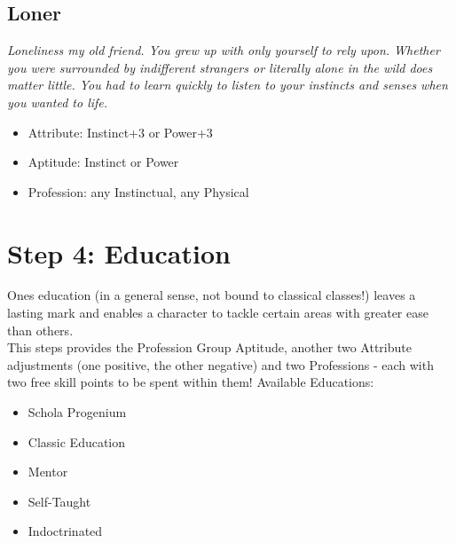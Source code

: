 	\subsection{Loner}
	\textit{Loneliness my old friend. You grew up with only yourself to rely upon. Whether you were surrounded by indifferent strangers or literally alone in the wild does matter little. You had to learn quickly to listen to your instincts and senses when you wanted to life.}
	\begin{itemize}
		\item Attribute: Instinct+3 or Power+3
		\item Aptitude: Instinct or Power
		\item Profession: any Instinctual, any Physical
	\end{itemize}


\section{Step 4: Education} %
	\label{sec:lifepath_4_education}
	Ones education (in a general sense, not bound to classical classes!) leaves a lasting mark and enables a character to tackle certain areas with greater ease than others.\\
	This steps provides the Profession Group Aptitude, another two Attribute adjustments (one positive, the other negative) and two Professions - each with two free skill points to be spent within them! Available Educations:
	\begin{itemize}
		\item Schola Progenium
		\item Classic Education
		\item Mentor
		\item Self-Taught
		\item Indoctrinated
	\end{itemize}

